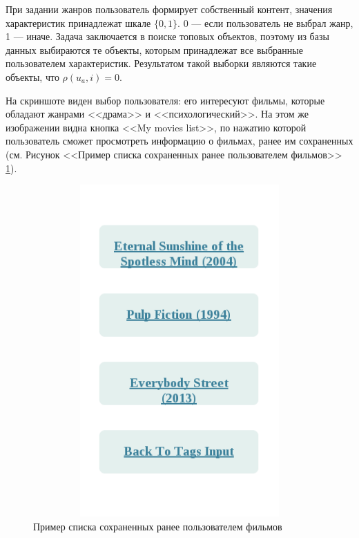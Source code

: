 При задании жанров пользователь формирует собственный контент, значения характеристик принадлежат шкале $\{0,1\}$.
0 --- если пользователь не выбрал жанр, 1 --- иначе. Задача заключается в поиске топовых объектов, поэтому
из базы данных выбираются те объекты, которым принадлежат все выбранные
пользователем характеристик. Результатом
такой выборки являются такие объекты, что $\rho(u_a, i) = 0$.

На скриншоте виден выбор пользователя: его интересуют фильмы, которые обладают
жанрами
<<драма>> и <<психологический>>. На этом же изображении
видна кнопка <<My movies list>>, по нажатию которой пользователь
сможет просмотреть информацию о фильмах, ранее им сохраненных
(см. Рисунок <<Пример списка сохраненных ранее пользователем фильмов>> \ref{pics:save}).
\begin{figure}
\caption{Пример списка сохраненных ранее пользователем фильмов}
	\label{pics:save}
\begin{center}
  \includegraphics[width=5in,height=5in]{pics/ml-mylist.png}
\end{center}
\end{figure}

